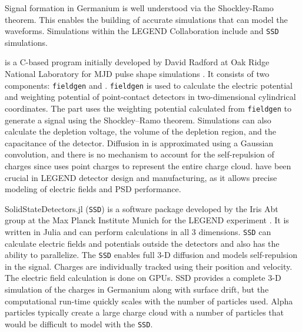 Signal formation in Germanium is well understood via the Shockley-Ramo theorem. This enables the building of accurate simulations that can model the waveforms. Simulations within the LEGEND Collaboration include {\siggen} and \texttt{SSD} simulations. 

{\siggen} is a C-based program initially developed by David Radford at Oak Ridge National Laboratory for MJD pulse shape simulations \cite{siggen_paper}. It consists of two components: \texttt{fieldgen} and {\siggen}. \texttt{fieldgen} is used to calculate the electric potential and weighting potential of point-contact detectors in two-dimensional cylindrical coordinates. The {\siggen} part uses the weighting potential calculated from \texttt{fieldgen} to generate a signal using the Shockley–Ramo theorem. Simulations can also calculate the depletion voltage, the volume of the depletion region, and the capacitance of the detector. Diffusion in {\siggen} is approximated using a Gaussian convolution, and there is no mechanism to account for the self-repulsion of charges since {\siggen} uses point charges to represent the entire charge cloud. {\siggen} have been crucial in LEGEND detector design and manufacturing, as it allows precise modeling of electric fields and PSD performance.



SolidStateDetectors.jl (\texttt{SSD}) is a software package developed by the Iris Abt group at the Max Planck Institute Munich for the LEGEND experiment \cite{Abt:2021SSD}. It is written in Julia and can perform calculations in all 3 dimensions. \texttt{SSD} can calculate electric fields and potentials outside the detectors and also has the ability to parallelize. The \texttt{SSD} enables full 3-D diffusion and models self-repulsion in the signal. Charges are individually tracked using their position and velocity. The electric field calculation is done on GPUs. SSD provides a complete 3-D simulation of the charges in Germanium along with surface drift, but the computational run-time quickly scales with the number of particles used. Alpha particles typically create a large charge cloud with a number of particles that would be difficult to model with the \texttt{SSD}.

